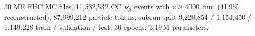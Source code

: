 30 ME FHC MC files, 11{,}532{,}532 CC~$\nu_\mu$ events with $z \ge 4000$~mm (41.9\% reconstructed), 87{,}999{,}212 particle tokens; subrun split 9{,}228{,}854 / 1{,}154{,}450 / 1{,}149{,}228 train / validation / test; 30 epochs; 3.19\,M parameters.
